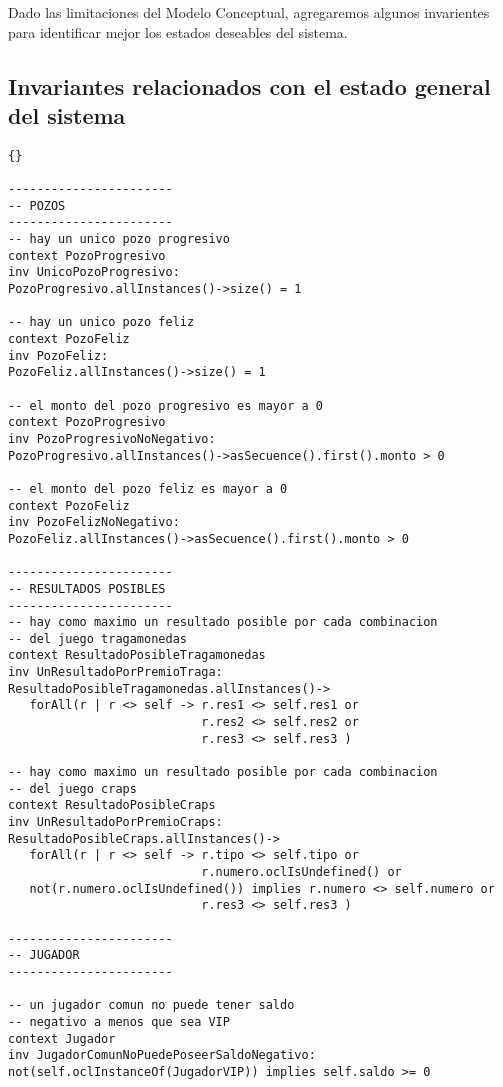 
\begin{framed}
\depto Dado las limitaciones del Modelo Conceptual, agregaremos algunos invarientes para identificar mejor los estados deseables del sistema.

\subsection{Invariantes relacionados con el estado general del sistema}
\lstset{language=ocl}
\lstset{commentstyle=\textit}
\begin{lstlisting}[frame=trbl]{}

-----------------------
-- POZOS
-----------------------
-- hay un unico pozo progresivo
context PozoProgresivo
inv UnicoPozoProgresivo:
PozoProgresivo.allInstances()->size() = 1

-- hay un unico pozo feliz
context PozoFeliz
inv PozoFeliz:
PozoFeliz.allInstances()->size() = 1

-- el monto del pozo progresivo es mayor a 0
context PozoProgresivo
inv PozoProgresivoNoNegativo:
PozoProgresivo.allInstances()->asSecuence().first().monto > 0

-- el monto del pozo feliz es mayor a 0
context PozoFeliz
inv PozoFelizNoNegativo:
PozoFeliz.allInstances()->asSecuence().first().monto > 0

-----------------------
-- RESULTADOS POSIBLES
-----------------------
-- hay como maximo un resultado posible por cada combinacion 
-- del juego tragamonedas
context ResultadoPosibleTragamonedas
inv UnResultadoPorPremioTraga:
ResultadoPosibleTragamonedas.allInstances()->
   forAll(r | r <> self -> r.res1 <> self.res1 or
                           r.res2 <> self.res2 or
                           r.res3 <> self.res3 )

-- hay como maximo un resultado posible por cada combinacion 
-- del juego craps
context ResultadoPosibleCraps
inv UnResultadoPorPremioCraps:
ResultadoPosibleCraps.allInstances()->
   forAll(r | r <> self -> r.tipo <> self.tipo or
                           r.numero.oclIsUndefined() or
   not(r.numero.oclIsUndefined()) implies r.numero <> self.numero or
                           r.res3 <> self.res3 )

-----------------------
-- JUGADOR
-----------------------

-- un jugador comun no puede tener saldo 
-- negativo a menos que sea VIP
context Jugador
inv JugadorComunNoPuedePoseerSaldoNegativo:
not(self.oclInstanceOf(JugadorVIP)) implies self.saldo >= 0


\end{lstlisting}
\end{framed}
